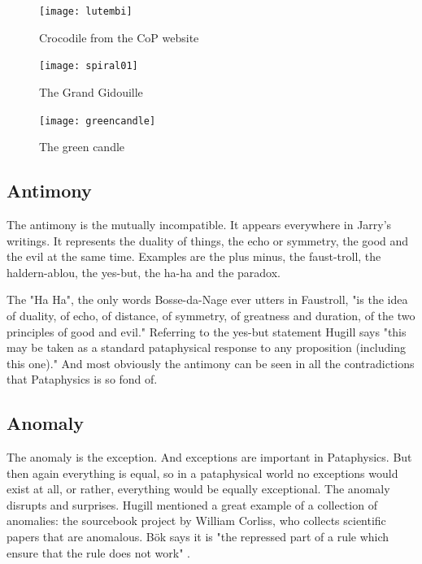 \begin{figure}[htb]
  \centering
  \begin{minipage}{.275\linewidth}
    \texttt{[image: lutembi]}
  \caption[Crocodile]{Crocodile from the CoP website}
  \label{img1}
  \end{minipage}
  \hspace{.05\linewidth}
  \begin{minipage}{.275\linewidth}
    \texttt{[image: spiral01]}
  \caption[Gidouille]{The Grand Gidouille}
  \label{img2}
  \end{minipage}
  \hspace{.05\linewidth}
  \begin{minipage}{.275\linewidth}
    \texttt{[image: greencandle]}
  \caption[Green Candle]{The green candle}
  \label{img3}
  \end{minipage}
\end{figure}

\subsection{Antimony}

The antimony is the mutually incompatible. It appears everywhere in Jarry's writings. It represents the duality of things, the echo or symmetry, the good and the evil at the same time. Examples are the plus minus, the faust-troll, the haldern-ablou, the yes-but, the ha-ha and the paradox.

The "Ha Ha", the only words Bosse-da-Nage ever utters in Faustroll, "is the idea of duality, of echo, of distance, of symmetry, of greatness and duration, of the two principles of good and evil." \citep{Hugill2012} Referring to the yes-but statement Hugill says "this may be taken as a standard pataphysical response to any proposition (including this one)." And most obviously the antimony can be seen in all the contradictions that Pataphysics is so fond of.

\subsection{Anomaly}

The anomaly is the exception. And exceptions are important in Pataphysics. But then again everything is equal, so in a pataphysical world no exceptions would exist at all, or rather, everything would be equally exceptional. The anomaly disrupts and surprises. Hugill mentioned a great example of a collection of anomalies: the sourcebook project by William Corliss, who collects scientific papers that are anomalous. Bök says it is "the repressed part of a rule which ensure that the rule does not work" \citep[p.38]{Bok2002}.

